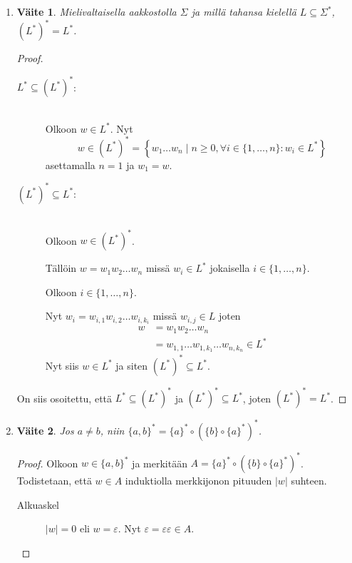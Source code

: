 \documentclass[a4paper,11pt,draft]{article}
\newtheorem*{claim}{Väite}
\begin{document}
\begin{enumerate}
\begin{enumerate}
\newpage
  \item
    \begin{claim}
      Mielivaltaisella aakkostolla $\Sigma$ ja millä tahansa kielellä
      $L \subseteq \Sigma^*$, $(L^*)^* = L^*$.
    \end{claim}
    \begin{proof}
      \hfill
      \begin{description}
      \item[$L^* \subseteq (L^*)^*$:] \hfill \\
        Olkoon $w \in L^*$. Nyt
        \begin{equation*}
        w \in (L^*)^* = \left\{w_1 \ldots w_n \mid n \ge 0,\forall i
        \in \{1, \ldots, n\}: w_i \in L^* \right\}
        \end{equation*}
        asettamalla $n = 1$ ja $w_1 = w$.
      \item[$(L^*)^* \subseteq L^*$:] \hfill \\
        Olkoon $w \in (L^*)^*$.

        Tällöin $w = w_1w_2 \ldots w_n$ missä $w_i \in L^*$ jokaisella
        $i \in \{1, \ldots, n\}$.

        Olkoon $i \in \{1, \ldots, n\}$.

        Nyt $w_i = w_{i,1}w_{i,2} \ldots w_{i,k_i}$ missä $w_{i,j} \in
        L$ joten
        \begin{align*}
          w &= w_1w_2 \ldots w_n \\
          &= w_{1,1} \ldots w_{1,k_1} \ldots w_{n,k_n} \in L^*
        \end{align*}
        Nyt siis $w \in L^*$ ja siten $(L^*)^* \subseteq L^*$.
      \end{description}

      On siis osoitettu, että $L^* \subseteq (L^*)^*$ ja $(L^*)^*
      \subseteq L^*$, joten $(L^*)^* = L^*$.
    \end{proof}

  \item
    \begin{claim}
      Jos $a \neq b$, niin $\{a,b\}^* = \{a\}^* \circ (\{b\} \circ \{a\}^*)^*$.
    \end{claim}
    \begin{proof}
      Olkoon $w \in \{a,b\}^*$ ja merkitään $A = \{a\}^* \circ
      \left(\{b\} \circ \{a\}^*\right)^*$. Todistetaan, että $w \in A$
      induktiolla merkkijonon pituuden $|w|$ suhteen.

      \begin{description}
      \item[Alkuaskel]
        $|w| = 0$ eli $w = \varepsilon$. Nyt $\varepsilon =
        \varepsilon\varepsilon \in A$.


\end{description}
\end{proof}
\end{enumerate}
\end{enumerate}
\end{document}
